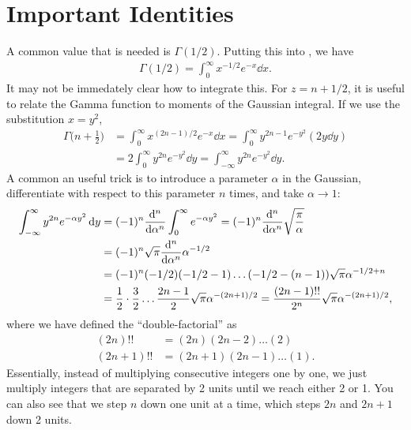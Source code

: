 \section{Important Identities}

A common value that is needed is $\Gamma(1/2)$.
Putting this into , we have
\begin{eqnarray}
    \Gamma(1/2) = \int_{0}^{\infty} x^{-1/2} e^{-x} \dd{x}
.\end{eqnarray}
It may not be immedately clear how to integrate this.
For $z = n + 1/2$, it is useful to relate the Gamma function to moments of the Gaussian integral.
If we use the substitution $x = y^2$,
\begin{align}
    \Gamma\Big(n + \frac{1}{2} \Big) &= \int_{0}^{\infty} x^{(2n-1)/2} e^{-x} \dd{x} = \int_{0}^{\infty} y^{2n - 1} e^{-y^2} ( 2 y \dd{y} ) \nonumber \\
    \label{eq:gamma-odd-half-int}
                                     &= 2 \int_{0}^{\infty} y^{2n} e^{-y^2} \dd{y} = \int_{-\infty}^{\infty} y^{2n} e^{-y^2} \dd{y}
.\end{align}
A common an useful trick is to introduce a parameter $\alpha$ in the Gaussian, differentiate with respect to this parameter $n$ times, and take $\alpha \rightarrow 1$:
\begin{align}
    \int_{-\infty}^{\infty} y^{2n} e^{-\alpha y^2} \dd{y} &= (-1)^{n} \dv[n]{\alpha} \int_{0}^{\infty} e^{-\alpha y^2} = (-1)^{n} \dv[n]{\alpha} \sqrt{\frac{\pi}{\alpha}} \nonumber \\
                                                          &= (-1)^{n} \sqrt{\pi} \dv[n]{\alpha} \alpha^{-1/2} \nonumber \\
                                                          &= (-1)^{n}(-1/2)(-1/2 - 1)\hdots(-1/2 - (n-1)) \sqrt{\pi} \alpha^{-1/2 + n} \nonumber \\
                                                          &= \frac{1}{2} \cdot \frac{3}{2} \ldots  \frac{2n-1}{2} \sqrt{\pi} \alpha^{-(2n+1)/2} = \frac{(2n-1)!!}{2^{n}} \sqrt{\pi} \alpha^{-(2n+1)/2}
,\end{align}
where we have defined the ``double-factorial'' as
\begin{align}
    (2n)!! &= (2n)(2n-2)\ldots(2) \\
    (2n+1)!! &= (2n+1)(2n-1)\ldots(1)
.\end{align}
Essentially, instead of multiplying consecutive integers one by one, we just multiply integers that are separated by 2 units until we reach either 2 or 1.
You can also see that we step $n$ down one unit at a time, which steps $2n$ and $2n+1$ down 2 units.

